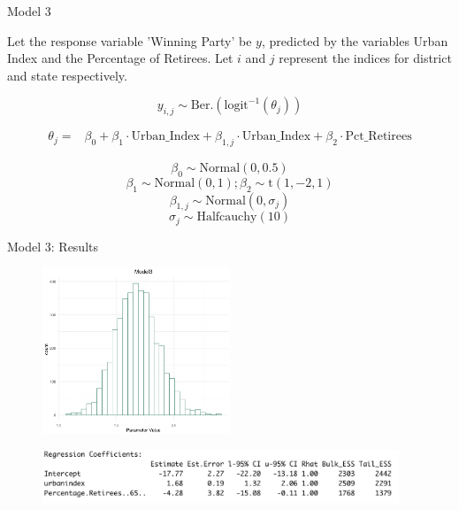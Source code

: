\documentclass{beamer}
\begin{document}
\begin{frame}{Model 3}

    Let the response variable 'Winning Party' be \(y\), predicted by the variables Urban Index and the Percentage of Retirees. Let \(i\) and \(j\) represent the indices for district and state respectively.

    \[
    y_{i,j} \sim \text{Ber.}\left(\text{logit}^{-1}(\theta_{j})\right)
    \]

\[
\begin{aligned}
\theta_{j} =   &\beta_0 + \beta_1 \cdot \text{Urban\_Index} + \beta_{1,j} \cdot \text{Urban\_Index} + \beta_2 \cdot \text{Pct\_Retirees}
\end{aligned}
\]

    \[\beta_0 \sim \text{Normal}(0, 0.5)\]
    \[\beta_1 \sim \text{Normal}(0, 1); \beta_2 \sim \text{t}(1,-2,1)\]
    \[\beta_{1,j} \sim \text{Normal}(0, \sigma_j)\]
    \[ \sigma_j \sim \text{Halfcauchy}(10)\]

\end{frame}


\begin{frame}{Model 3: Results}
    \begin{figure}
        \includegraphics[width=0.5\textwidth]{plots/model3_postui.png}
    \end{figure}
    \begin{figure}
        \includegraphics[width=0.95\textwidth]{plots/model3_coeff.png}
    \end{figure}
\end{frame}
\end{document}
